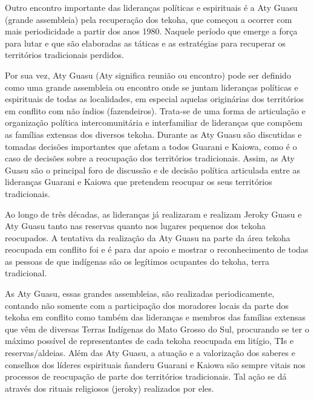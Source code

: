 \documentclass{article}
\begin{document}
Outro encontro importante das lideran\c{c}as pol\'iticas e espirituais
\'e a Aty Guasu (grande assembleia) pela recupera\c{c}\~ao dos tekoha,
que come\c{c}ou a ocorrer com mais periodicidade a partir dos anos
1980.  Naquele per\'iodo que emerge a for\c{c}a para lutar e que s\~ao
elaboradas as t\'aticas e as estrat\'egias para recuperar os
territ\'orios tradicionais perdidos.

Por sua vez, Aty Guasu (Aty significa reuni\~ao ou encontro) pode ser
definido como uma grande assembleia ou encontro onde se juntam
lideran\c{c}as pol\'iticas e espirituais de todas as localidades, em
especial aquelas origin\'arias dos territ\'orios em conflito com n\~ao
\'indios (fazendeiros). Trata-se de uma forma de articula\c{c}\~ao e
organiza\c{c}\~ao pol\'itica intercomunit\'aria e interfamiliar de
lideran\c{c}as que comp\~oem as fam\'ilias extensas dos diversos
tekoha. Durante as Aty Guasu s\~ao discutidas e tomadas decis\~oes
importantes que afetam a todos Guarani e Kaiowa, como \'e o caso de
decis\~oes sobre a reocupa\c{c}\~ao dos territ\'orios tradicionais.
Assim, as Aty Guasu s\~ao o principal foro de discuss\~ao e de
decis\~ao pol\'itica articulada entre as lideran\c{c}as Guarani e
Kaiowa que pretendem reocupar os seus territ\'orios tradicionais. 

Ao longo de tr\^es d\'ecadas, as lideran\c{c}as j\'a realizaram e
realizam Jeroky Guasu e Aty Guasu tanto nas reservas quanto nos lugares
pequenos dos tekoha reocupados. A tentativa da realiza\c{c}\~ao da Aty
Guasu na parte da \'area tekoha reocupada em conflito foi e \'e para
dar apoio e mostrar o reconhecimento de todas as pessoas de que
ind\'igenas s\~ao os leg\'itimos ocupantes do tekoha, terra
tradicional. 

As Aty Guasu, essas grandes assembleias, s\~ao realizadas
periodicamente, contando n\~ao somente com a participa\c{c}\~ao dos
moradores locais da parte dos tekoha em conflito como tamb\'em das
lideran\c{c}as e membros das fam\'ilias extensas que v\^em de diversas
Terras Ind\'igenas do Mato Grosso do Sul, procurando se ter o m\'aximo
poss\'ivel de representantes de cada tekoha reocupada em lit\'igio, 
TIs e reservas/aldeias. Al\'em das Aty Guasu, a atua\c{c}\~ao e a
valoriza\c{c}\~ao dos saberes e conselhos dos l\'ideres espirituais
\~nanderu Guarani e Kaiowa s\~ao sempre vitais nos processos de
reocupa\c{c}\~ao de parte dos territ\'orios tradicionais. Tal
a\c{c}\~ao se d\'a atrav\'es dos rituais religiosos (jeroky) realizados
por eles.
\end{document}
